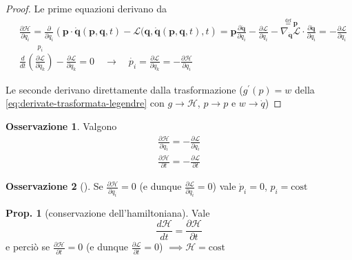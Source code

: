 \documentclass[a4paper,10pt]{article}
\theoremstyle{definition}
\newcommand{\bv}{\boldsymbol} %
\theoremstyle{indentdefinition}
\theoremstyle{indenttheorem}
\newtheorem{prop}{Prop.}
\theoremstyle{myremark}
\newtheorem*{rem*}{Osservazione}
\theoremstyle{indentgeneral}
\begin{document}
\begin{proof}
Le prime equazioni derivano da 
\begin{align*}
&\frac{\partial\mathcal{H}}{\partial q_{i}} =\frac{\partial}{\partial q_i}\left(\bv{p}\cdot\dot{\bv{q}}(\bv{p},\bv{q},t)-\mathcal{L}(\bv{q},\dot{\bv{q}}(\bv{p},\bv{q},t),t\right)=\bv{p}\frac{\partial\dot{\bv{q}}}{\partial q_{i}}-\frac{\partial\mathcal{L}}{\partial q_{i}}-\overset{\overset{\text{def}}{=}\bv{p}}{\boxed{\nabla_{\dot{\bv{q}}}\mathcal{L}}}\cdot\frac{\partial\dot{\bv{q}}}{\partial q_{i}}=-\frac{\partial\mathcal{L}}{\partial q_{i}}  \\
&\frac{d}{dt}\overset{p_{i}}{\left(\boxed{\frac{\partial\mathcal{L}}{\partial\dot{q}_{k}}}\right)}-\frac{\partial\mathcal{L}}{\partial q_{k}}=0  \quad\rightarrow\quad\dot{p_{i}}=\frac{\partial\mathcal{L}}{\partial q_{k}}=-\frac{\partial\mathcal{H}}{\partial q_{i}}
\end{align*}

Le seconde derivano direttamente dalla trasformazione ($g^{\prime}\left(p\right)=w$
della \ref{eq:derivate-trasformata-legendre} con $g\rightarrow\mathcal{H}$,
$p\rightarrow p$ e $w\rightarrow\dot{q}$)
\end{proof}
\begin{rem*}
Valgono 
\begin{align*}
    \frac{\partial\mathcal{H}}{\partial q_{i}}=-\frac{\partial\mathcal{L}}{\partial q_{i}} \\
    \frac{\partial\mathcal{H}}{\partial t}=-\frac{\partial\mathcal{L}}{\partial t}
\end{align*}
\end{rem*}
%
\begin{rem*}[]
Se $\frac{\partial\mathcal{H}}{\partial q_{i}}=0$ (e dunque $\frac{\partial\mathcal{L}}{\partial q_{i}}=0$)
vale $\dot{p}_{i}=0$, $p_{i}=\text{cost}$
\end{rem*}
\begin{prop}[conservazione dell'hamiltoniana] Vale
\label{prop:conservazione-hamiltoniana}
$$\frac{d\mathcal{H}}{dt}=\frac{\partial\mathcal{H}}{\partial t}$$
e perciò se $\frac{\partial\mathcal{H}}{\partial t}=0$ (e dunque
$\frac{\partial\mathcal{L}}{\partial t}=0$) $\implies\mathcal{H}=\text{cost}$
\end{prop}
\end{document}
